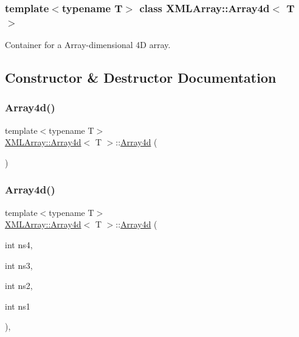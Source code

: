 \subsubsection*{template$<$typename T$>$\newline
class X\+M\+L\+Array\+::\+Array4d$<$ T $>$}

Container for a Array-\/dimensional 4D array. 

\subsection{Constructor \& Destructor Documentation}
\mbox{\label{classXMLArray_1_1Array4d_a4ce7f5a0bcb93fd0bd98a5fa0eb09a3d}} 
\subsubsection{\texorpdfstring{Array4d()}{Array4d()}\hspace{0.1cm}{\footnotesize\ttfamily [1/6]}}
{\footnotesize\ttfamily template$<$typename T$>$ \\
\mbox{\hyperlink{classXMLArray_1_1Array4d}{X\+M\+L\+Array\+::\+Array4d}}$<$ T $>$\+::\mbox{\hyperlink{classXMLArray_1_1Array4d}{Array4d}} (\begin{DoxyParamCaption}{ }\end{DoxyParamCaption})\hspace{0.3cm}{\ttfamily [inline]}}

\mbox{\label{classXMLArray_1_1Array4d_a409005374380cbfb8553f3237db7990b}} 
\subsubsection{\texorpdfstring{Array4d()}{Array4d()}\hspace{0.1cm}{\footnotesize\ttfamily [2/6]}}
{\footnotesize\ttfamily template$<$typename T$>$ \\
\mbox{\hyperlink{classXMLArray_1_1Array4d}{X\+M\+L\+Array\+::\+Array4d}}$<$ T $>$\+::\mbox{\hyperlink{classXMLArray_1_1Array4d}{Array4d}} (\begin{DoxyParamCaption}\item[{int}]{ns4,  }\item[{int}]{ns3,  }\item[{int}]{ns2,  }\item[{int}]{ns1 }\end{DoxyParamCaption})\hspace{0.3cm}{\ttfamily [inline]}, {\ttfamily [explicit]}}

